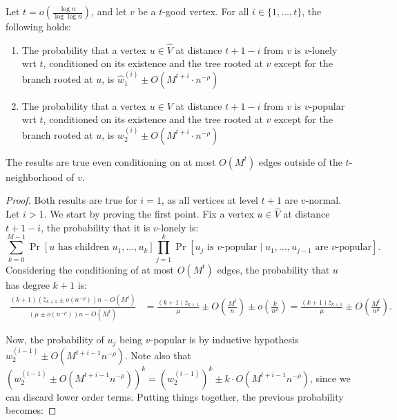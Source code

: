 \documentclass[11pt]{article}
\newcommand{\maxdeg}{M}
\begin{document}
\begin{toappendix}
\begin{lemma}\label{lem:bg-adaptation-3-6}
Let $t=o\left(\frac{\log n}{\log\log n}\right)$, and let $v$ be a $t$-good vertex. For all $i\in\{1,\dots, t\}$, the following holds:
\begin{enumerate}
\item The probability that a vertex $u\in \hat{V}$ at distance $t+1-i$ from $v$ is $v$-lonely wrt $t$, conditioned on its existence and the tree rooted at $v$ except for the branch rooted at $u$, is $\hat{w}_1^{(i)} \pm O(\maxdeg^{t+i} \cdot n^{-\rho})$
\item The probability that a vertex $u\in V$ at distance $t+1-i$ from $v$ is $v$-popular wrt $t$, conditioned on its existence and the tree rooted at $v$ except for the branch rooted at $u$, is $w_2^{(i)} \pm O(\maxdeg^{t+i} \cdot n^{-\rho})$
\end{enumerate}
The results are true even conditioning on at most $O(\maxdeg^t)$ edges outside of the $t$-neighborhood of $v$.
\end{lemma}
\begin{proof}
Both results are true for $i=1$, as all vertices at level $t+1$ are $v$-normal. Let $i>1$. We start by proving the first point. Fix a vertex $u\in \hat{V}$ at distance $t+1-i$, the probability that it is $v$-lonely is:
\[
\sum_{k=0}^{\maxdeg-1} \Pr[u\text{ has children }u_1,\dots,u_k] \prod_{j=1}^k \Pr[u_j\text{ is $v$-popular} \mid u_1,\dots,u_{j-1}\text{ are $v$-popular}].
\]
Considering the conditioning of at most $O(\maxdeg^t)$ edges, the probability that $u$ has degree $k+1$ is:
\begin{align*}
\frac{(k+1)(\hat{z}_{k+1}\pm o(n^{-\rho}))n - O(\maxdeg^t)}{(\mu\pm o(n^{-\rho}))n - O(\maxdeg^t)} &= \frac{(k+1)\hat{z}_{k+1}}{\mu} \pm O\left(\frac{\maxdeg^t}{n}\right) \pm o\left(\frac{k}{n^{\rho}}\right) = \frac{(k+1)\hat{z}_{k+1}}{\mu} \pm O\left(\frac{\maxdeg^t}{n^{\rho}}\right).
\end{align*}

Now, the probability of $u_j$ being $v$-popular is by inductive hypothesis $w_2^{(i-1)} \pm O(\maxdeg^{t+i-1} n^{-\rho})$. Note also that $\left(w_2^{(i-1)} \pm O(\maxdeg^{t+i-1} n^{-\rho})\right)^k = (w_2^{(i-1)})^k \pm k\cdot O(\maxdeg^{t+i-1} n^{-\rho})$, since we can discard lower order terms. Putting things together, the previous probability becomes:


\end{proof}
\end{toappendix}
\end{document}
